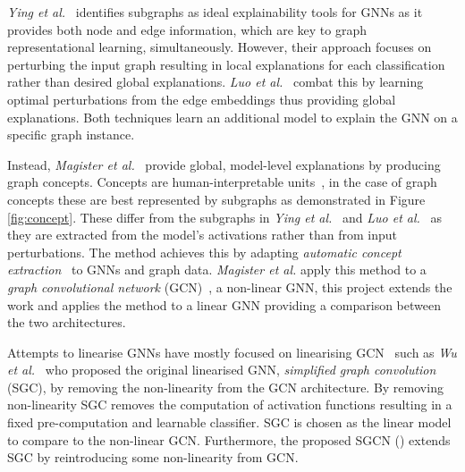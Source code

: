\textit{Ying et al.}~\cite{ying2019gnnexplainer} identifies subgraphs as ideal explainability tools for GNNs as it provides both node and edge information, which are key to graph representational learning, simultaneously. 
However, their approach focuses on perturbing the input graph resulting in local explanations for each classification rather than desired global explanations.
\textit{Luo et al.}~\cite{luo2020parameterized} combat this by learning optimal perturbations from the edge embeddings thus providing global explanations.
Both techniques learn an additional model to explain the GNN on a specific graph instance.

Instead, \textit{Magister et al.}~\cite{magister2021gcexplainer} provide global, model-level explanations by producing graph concepts.
Concepts are human-interpretable units~\cite{ghorbani2019towards}, in the case of graph concepts these are best represented by subgraphs as demonstrated in Figure \ref{fig:concept}.
These differ from the subgraphs in \textit{Ying et al.}~\cite{ying2019gnnexplainer} and \textit{Luo et al.}~\cite{luo2020parameterized} as they are extracted from the model's activations rather than from input perturbations.
The method achieves this by adapting \textit{automatic concept extraction}~\cite{ghorbani2019towards} to GNNs and graph data.
\textit{Magister et al.} apply this method to a \emph{graph convolutional network} (GCN)~\cite{kipf2016semi}, a non-linear GNN, this project extends the work and applies the method to a linear GNN providing a comparison between the two architectures.

Attempts to linearise GNNs have mostly focused on linearising GCN~\cite{kipf2016semi} such as \textit{Wu et al.}~\cite{wu2019simplifying} who proposed the original linearised GNN, \emph{simplified graph convolution} (SGC), by removing the non-linearity from the GCN architecture.
By removing non-linearity SGC removes the computation of activation functions resulting in a fixed pre-computation and learnable classifier.
SGC is chosen as the linear model to compare to the non-linear GCN.
Furthermore, the proposed SGCN () extends SGC by reintroducing some non-linearity from GCN.

